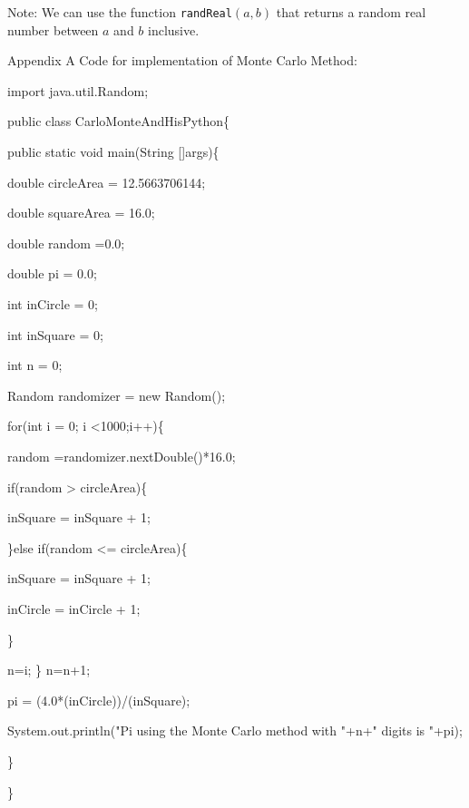 \documentclass{article}
\begin{document}
Note: We can use the function \texttt{randReal}$(a,b)$ that returns a random
real number between $a$ and $b$ inclusive.

\nextprob
Appendix A Code for implementation of Monte Carlo Method:

import java.util.Random;

public class CarloMonteAndHisPython\{

\quad     public static void main(String []args)\{

\quad \quad        double circleArea = 12.5663706144;

\quad \quad        double squareArea = 16.0;

\quad \quad        double random =0.0;

\quad \quad        double pi = 0.0;

\quad \quad        int inCircle = 0;

\quad \quad        int inSquare = 0;

\quad \quad        int n = 0;

\quad \quad        Random randomizer = new Random();
        
\quad \quad        for(int i = 0; i <1000;i++)\{

\quad \quad \quad            random =randomizer.nextDouble()*16.0;

\quad \quad \quad             if(random > circleArea)\{

\quad \quad \quad \quad                 inSquare = inSquare + 1;

\quad \quad \quad             \}else if(random <= circleArea)\{

\quad \quad \quad \quad                 inSquare = inSquare + 1;

\quad \quad \quad \quad                 inCircle = inCircle + 1;

\quad \quad \quad             \}

\quad \quad \quad             n=i;
\quad \quad        \}
\quad \quad  
\quad \quad          n=n+1;

\quad \quad          pi = (4.0*(inCircle))/(inSquare);

        
        
\quad \quad          System.out.println("Pi using the Monte Carlo method with "+n+" digits is "+pi);
        
     \}

\}
\end{document}
